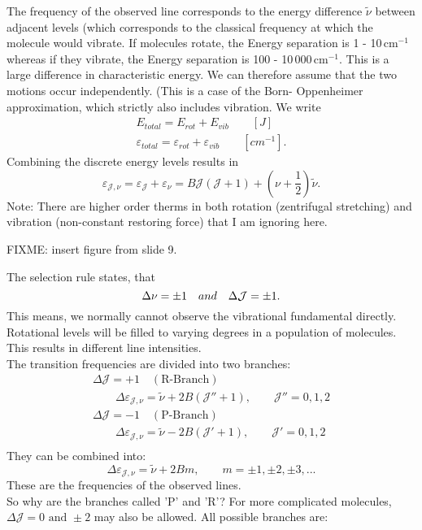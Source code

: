 \documentclass[a4paper,fleqn]{article}
\renewcommand{\epsilon}{\varepsilon}  %
\begin{document}
The frequency of the observed line corresponds to the energy difference $\tilde{\nu}$ between adjacent levels (which corresponds to the classical frequency at which the molecule would vibrate. If molecules rotate, the Energy separation is 1 - 10\,cm$^{-1}$ whereas if they vibrate, the Energy separation is 100 - 10\,000\,cm$^{-1}$. This is a large difference in characteristic energy. We can therefore assume that the two motions occur independently.
 (This is a case of the Born- Oppenheimer approximation, which strictly also includes vibration. We write
 \begin{gather}
E_{total} = E_{rot} + E_{vib} \qquad \left[J\right]  \\
\epsilon_{total} = \epsilon_{rot} + \epsilon_{vib} \qquad \left[cm^{-1}\right].
 \end{gather}
Combining the discrete energy levels results in
\begin{equation}
\epsilon_{\mathcal{J},\nu} = \epsilon_{\mathcal{J}} + \epsilon_{\nu} = B \mathcal{J} (\mathcal{J} + 1) + (\nu + \frac{1}{2})\tilde{\nu}.
\end{equation}
Note: There are higher order therms in both rotation (zentrifugal stretching) and vibration (non-constant restoring force) that I am ignoring here. \par
 FIXME: insert figure from slide 9. \par
 The selection rule states, that
 \begin{equation}
\Delta \nu = \pm 1 \text \quad {and} \quad \Delta \mathcal{J} = \pm 1.
\end{equation}
This means, we normally cannot observe the vibrational fundamental directly. Rotational levels will be filled to varying degrees in a population of molecules. This results in different line intensities. \\
The transition frequencies are divided into two branches:
\begin{gather*}
\Delta \mathcal{J} = +1 \quad (\text{R-Branch}) \\
\qquad \Delta \epsilon_{\mathcal{J},\nu} = \tilde{\nu} + 2 B ( \mathcal{J''} + 1), 
	\qquad \mathcal{J''} = 0, 1, 2  \\
\Delta \mathcal{J} = -1 \quad (\text{P-Branch}) \\
\qquad \Delta \epsilon_{\mathcal{J},\nu} = \tilde{\nu} - 2 B ( \mathcal{J'} + 1) , 
	\qquad \mathcal{J'} = 0, 1, 2  \\ 
\end{gather*}
 They can be combined into: 
 \begin{equation}
\Delta \epsilon_{\mathcal{J},\nu} = \tilde{\nu} + 2 B m , 
	\qquad m = \pm1, \pm2, \pm3, ...
\end{equation}
These are the frequencies of the observed lines. \\
So why are the branches called 'P' and 'R'? For more complicated molecules, $\Delta \mathcal{J} = 0 \text{ and } \pm 2$ may also be allowed. All possible branches are:
\end{document}
